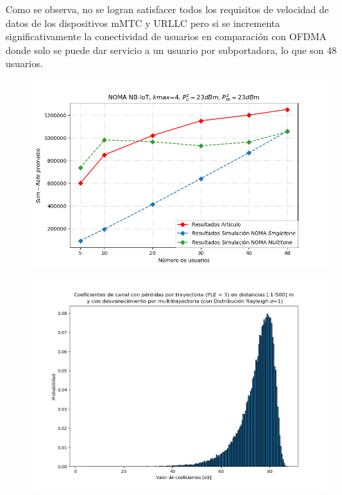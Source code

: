 Como se observa, no se logran satisfacer todos los requisitos de velocidad de datos de los dispositivos mMTC y URLLC pero si se incrementa significativamente la conectividad de usuarios en comparación con OFDMA donde solo se puede dar servicio a un usuario por subportadora, lo que son 48 usuarios.\newline


\begin{figure}[th]
    \centering
    \includegraphics[scale=.7]{Figures/NOMA_sumrate.png}
    \decoRule
    \caption[]{}
    \label{fig:ResultsNOMA}
\end{figure}

\begin{figure}[th]
    \centering
    \includegraphics[scale=.7]{Figures/CoeficientesCanalShahini}
    \decoRule
    \caption[]{}
    \label{fig:CoeficientesCanalShahini}
\end{figure}





